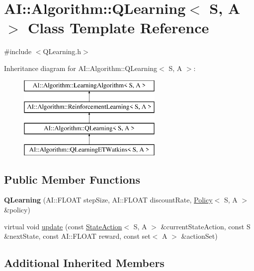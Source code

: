 \hypertarget{classAI_1_1Algorithm_1_1QLearning}{\section{A\-I\-:\-:Algorithm\-:\-:Q\-Learning$<$ S, A $>$ Class Template Reference}
\label{classAI_1_1Algorithm_1_1QLearning}
}


{\ttfamily \#include $<$Q\-Learning.\-h$>$}

Inheritance diagram for A\-I\-:\-:Algorithm\-:\-:Q\-Learning$<$ S, A $>$\-:\begin{figure}[H]
\begin{center}
\leavevmode
\includegraphics[height=4.000000cm]{classAI_1_1Algorithm_1_1QLearning}
\end{center}
\end{figure}
\subsection*{Public Member Functions}
\begin{DoxyCompactItemize}
\item 
\hypertarget{classAI_1_1Algorithm_1_1QLearning_a755235439225d9ba78440f2ef7441c81}{{\bfseries Q\-Learning} (A\-I\-::\-F\-L\-O\-A\-T step\-Size, A\-I\-::\-F\-L\-O\-A\-T discount\-Rate, \hyperlink{classAI_1_1Algorithm_1_1Policy}{Policy}$<$ S, A $>$ \&policy)}\label{classAI_1_1Algorithm_1_1QLearning_a755235439225d9ba78440f2ef7441c81}

\item 
virtual void \hyperlink{classAI_1_1Algorithm_1_1QLearning_a042e1987ce21a94f59603c4cb1eeed82}{update} (const \hyperlink{classAI_1_1StateAction}{State\-Action}$<$ S, A $>$ \&current\-State\-Action, const S \&next\-State, const A\-I\-::\-F\-L\-O\-A\-T reward, const set$<$ A $>$ \&action\-Set)
\end{DoxyCompactItemize}
\subsection*{Additional Inherited Members}


